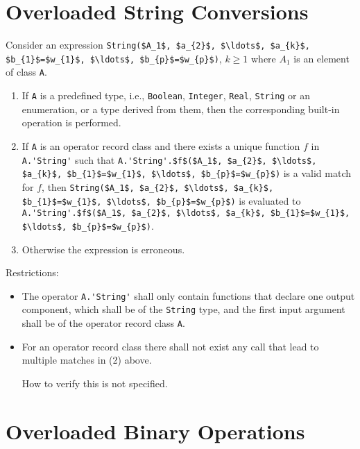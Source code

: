 \section{Overloaded String Conversions}\label{overloaded-string-conversions}

Consider an expression \lstinline!String($A_1$, $a_{2}$, $\ldots$, $a_{k}$, $b_{1}$=$w_{1}$, $\ldots$, $b_{p}$=$w_{p}$)!,
$k \ge 1$ where $A_1$ is an element of class \lstinline!A!.

\begin{enumerate}
\item
  If \lstinline!A! is a predefined type, i.e., \lstinline!Boolean!, \lstinline!Integer!, \lstinline!Real!, \lstinline!String! or
  an enumeration, or a type derived from them, then the corresponding
  built-in operation is performed.
\item
  If \lstinline!A! is an operator record class and there exists a unique function
  $f$ in \lstinline!A.'String'! such that
  \lstinline!A.'String'.$f$($A_1$, $a_{2}$, $\ldots$, $a_{k}$, $b_{1}$=$w_{1}$, $\ldots$, $b_{p}$=$w_{p}$)!
  is a valid match for $f$, then
  \lstinline!String($A_1$, $a_{2}$, $\ldots$, $a_{k}$, $b_{1}$=$w_{1}$, $\ldots$, $b_{p}$=$w_{p}$)!
  is evaluated to\\
  \lstinline!A.'String'.$f$($A_1$, $a_{2}$, $\ldots$, $a_{k}$, $b_{1}$=$w_{1}$, $\ldots$, $b_{p}$=$w_{p}$)!.
\item
  Otherwise the expression is erroneous.
\end{enumerate}

Restrictions:
\begin{itemize}
\item
  The operator \lstinline!A.'String'! shall only contain functions that declare one
  output component, which shall be of the \lstinline!String! type, and the first
  input argument shall be of the operator record class \lstinline!A!.
\item
  For an operator record class there shall not exist any call that lead
  to multiple matches in (2) above.
  \begin{nonnormative}
  How to verify this is not specified.
  \end{nonnormative}
\end{itemize}

\section{Overloaded Binary Operations}\label{overloaded-binary-operations}

